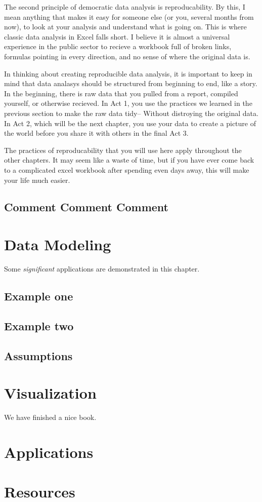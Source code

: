 \documentclass[]{book}
\begin{document}
The second principle of democratic data analysis is reproducability. By
this, I mean anything that makes it easy for someone else (or you,
several months from now), to look at your analysis and understand what
is going on. This is where classic data analysis in Excel falls short. I
believe it is almost a universal experience in the public sector to
recieve a workbook full of broken links, formulas pointing in every
direction, and no sense of where the original data is.

In thinking about creating reproducible data analysis, it is important
to keep in mind that data analasys should be structured from beginning
to end, like a story. In the beginning, there is raw data that you
pulled from a report, compiled yourself, or otherwise recieved. In Act
1, you use the practices we learned in the previous section to make the
raw data tidy-- Without distroying the original data. In Act 2, which
will be the next chapter, you use your data to create a picture of the
world before you share it with others in the final Act 3.

The practices of reproducability that you will use here apply throughout
the other chapters. It may seem like a waste of time, but if you have
ever come back to a complicated excel workbook after spending even days
away, this will make your life much easier.

\section{Comment Comment Comment}\label{comment-comment-comment}

\chapter{Data Modeling}\label{data-modeling}

Some \emph{significant} applications are demonstrated in this chapter.

\section{Example one}\label{example-one}

\section{Example two}\label{example-two}

\section{Assumptions}\label{assumptions}

\chapter{Visualization}\label{visualization}

We have finished a nice book.

\chapter{Applications}\label{applications}

\chapter{Resources}\label{resources}


\end{document}
